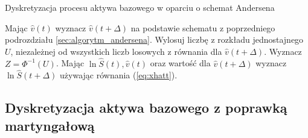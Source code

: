 \documentclass{pracamgr}
\begin{document}
\begin{algorithm}[H]
\caption{Dyskretyzacja procesu aktywa bazowego w oparciu o schemat Andersena}\label{andersenAlgorithmAssetLabel}

\begin{algorithmic}[1]

  \State Mając $\hat{v}(t)$ wyznacz $\hat{v}(t + \Delta)$ na podstawie 
         schematu z poprzedniego podrozdziału \ref{sec:algorytm_andersena}.
  \State Wylosuj liczbę z rozkładu jednostajnego $U$, niezależnej 
         od wszystkich liczb losowych z równania dla $\hat{v}(t + \Delta)$.
  \State Wyznacz $Z = \Phi^{-1}(U)$.
  \State Mając $\ln \hat{S}(t), \hat{v}(t)$ oraz wartość dla $\hat{v}(t + \Delta)$ 
         wyznacz $\ln \hat{S} (t+\Delta)$ używając równania (\ref{eq:xhatt}).

\end{algorithmic}
\label{alg:andersenAlgorithmAsset}
\end{algorithm}


 
\subsection{Dyskretyzacja aktywa bazowego z poprawką martyngałową}
\end{document}
